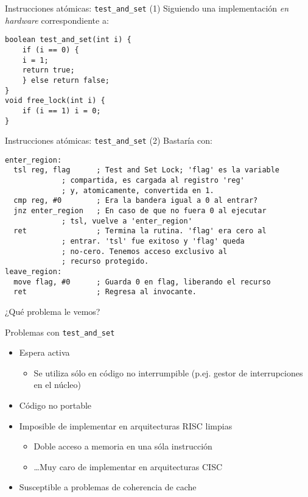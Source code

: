 \documentclass[presentation]{beamer}
\begin{document}
\begin{frame}[label={sec:orga40190e},fragile]{Instrucciones atómicas: \texttt{test\_and\_set} (1)}
 Siguiendo una implementación \emph{en hardware} correspondiente a:
\begin{verbatim}
boolean test_and_set(int i) {
    if (i == 0) {
	i = 1;
	return true;
    } else return false;
}
void free_lock(int i) {
    if (i == 1) i = 0;
}
\end{verbatim}
\end{frame}

\begin{frame}[label={sec:orgfba88fe},fragile]{Instrucciones atómicas: \texttt{test\_and\_set} (2)}
 Bastaría con:
\begin{verbatim}
enter_region:
  tsl reg, flag      ; Test and Set Lock; 'flag' es la variable
		     ; compartida, es cargada al registro 'reg'
		     ; y, atomicamente, convertida en 1.
  cmp reg, #0        ; Era la bandera igual a 0 al entrar?
  jnz enter_region   ; En caso de que no fuera 0 al ejecutar
		     ; tsl, vuelve a 'enter_region'
  ret                ; Termina la rutina. 'flag' era cero al
		     ; entrar. 'tsl' fue exitoso y 'flag' queda
		     ; no-cero. Tenemos acceso exclusivo al
		     ; recurso protegido.
leave_region:
  move flag, #0      ; Guarda 0 en flag, liberando el recurso
  ret                ; Regresa al invocante.
\end{verbatim}

\begin{center}
¿Qué problema le vemos?
\end{center}
\end{frame}

\begin{frame}[label={sec:org7464561},fragile]{Problemas con \texttt{test\_and\_set}}
 \begin{itemize}
\item Espera activa
\begin{itemize}
\item Se utiliza sólo en código no interrumpible (p.ej. gestor de
interrupciones en el núcleo)
\end{itemize}
\item Código no portable
\item Imposible de implementar en arquitecturas RISC limpias
\begin{itemize}
\item Doble acceso a memoria en una sóla instrucción
\item \ldots{}Muy caro de implementar en arquitecturas CISC
\end{itemize}
\item Susceptible a problemas de coherencia de cache
\end{itemize}
\end{frame}
\end{document}

